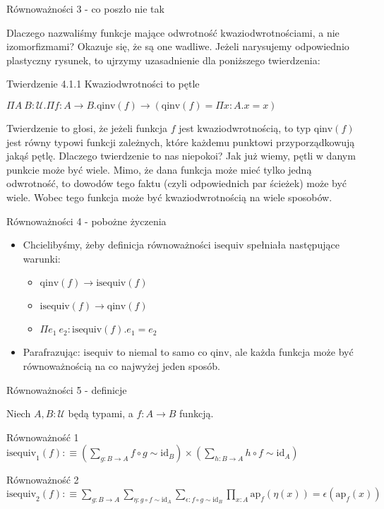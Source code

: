 \documentclass{beamer}
\newcommand{\defn}{:\equiv}
\newcommand{\U}{\mathcal{U}}
\newcommand{\id}{\text{id}}
\newcommand{\comp}{\circ}
\newcommand{\ap}[2]{\text{ap}_{#1}(#2)}
\newcommand{\qinv}{\text{qinv}}
\newcommand{\isequiv}{\text{isequiv}}
\begin{document}
\begin{frame}{Równoważności 3 - co poszło nie tak}

Dlaczego nazwaliśmy funkcje mające odwrotność kwaziodwrotnościami, a nie izomorfizmami? Okazuje się, że są one wadliwe. Jeżeli narysujemy odpowiednio plastyczny rysunek, to ujrzymy uzasadnienie dla poniższego twierdzenia:

\begin{block}{Twierdzenie 4.1.1 Kwaziodwrotności to pętle}

$\Pi A\ B : \U. \Pi f : A \to B. \qinv(f) \to (\qinv(f) = \Pi x : A. x = x)$

\end{block}

Twierdzenie to głosi, że jeżeli funkcja $f$ jest kwaziodwrotnością, to typ $\qinv(f)$ jest równy typowi funkcji zależnych, które każdemu punktowi przyporządkowują jakąś pętlę. Dlaczego twierdzenie to nas niepokoi? Jak już wiemy, pętli w danym punkcie może być wiele. Mimo, że dana funkcja może mieć tylko jedną odwrotność, to dowodów tego faktu (czyli odpowiednich par ścieżek) może być wiele. Wobec tego funkcja może być kwaziodwrotnością na wiele sposobów.

\end{frame}

\begin{frame}{Równoważności 4 - pobożne życzenia}
\begin{itemize}
	\item Chcielibyśmy, żeby definicja równoważności $\isequiv$ spełniała następujące warunki:
	\begin{itemize}
		\item $\qinv(f) \to \isequiv(f)$
		\item $\isequiv(f) \to \qinv(f)$
		\item $\Pi e_1\ e_2 : \isequiv(f). e_1 = e_2$
	\end{itemize}
	\item Parafrazując: $\isequiv$ to niemal to samo co $\qinv$, ale każda funkcja może być równoważnością na co najwyżej jeden sposób.
\end{itemize}
\end{frame}

\begin{frame}{Równoważności 5 - definicje}

Niech $A, B : \U$ będą typami, a $f : A \to B$ funkcją.

\begin{block}{Równoważność 1}
$
\displaystyle
	\isequiv_1(f) \defn
		\left(\sum_{g : B \to A} f \comp g \sim \id_B\right) \times
		\left(\sum_{h : B \to A} h \comp f \sim \id_A\right)
$
\end{block}

\begin{block}{Równoważność 2}
$
\displaystyle
	\isequiv_2(f) \defn
		\sum_{g : B \to A} \sum_{\eta : g \comp f \sim \id_A} \sum_{\epsilon : f \comp g \sim \id_B}
			\prod_{x : A} \ap{f}{\eta(x)} = \epsilon(\ap{f}{x})
$
\end{block}

\end{frame}
\end{document}
